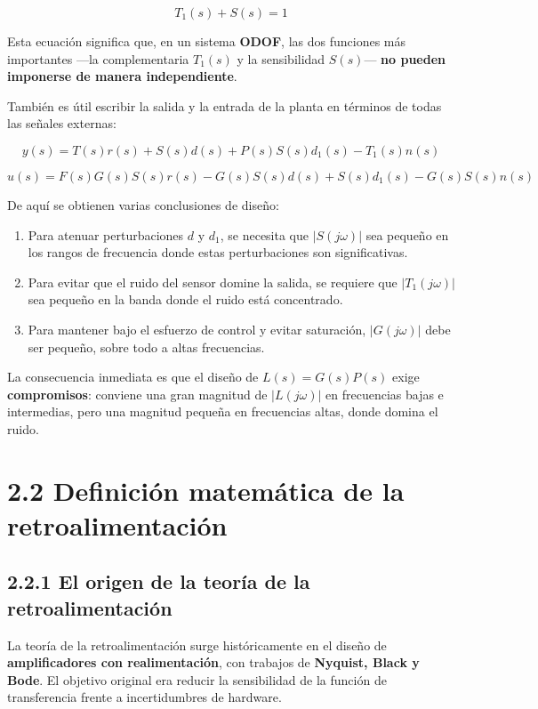 \[
T_1(s)+S(s)=1 \tag{2.1.8}
\]

Esta ecuación significa que, en un sistema \textbf{ODOF}, las dos funciones más importantes —la complementaria \(T_1(s)\) y la sensibilidad \(S(s)\)— \textbf{no pueden imponerse de manera independiente}.

También es útil escribir la salida y la entrada de la planta en términos de todas las señales externas:

\[
y(s)=T(s)r(s)+S(s)d(s)+P(s)S(s)d_1(s)-T_1(s)n(s) \tag{2.1.9}
\]

$$
u(s)=F(s)G(s)S(s)r(s)-G(s)S(s)d(s)+S(s)d_1(s)-G(s)S(s)n(s)
$$

De aquí se obtienen varias conclusiones de diseño:

\begin{enumerate}
  \item Para atenuar perturbaciones \(d\) y \(d_1\), se necesita que \(|S(j\omega)|\) sea pequeño en los rangos de frecuencia donde estas perturbaciones son significativas.
  \item Para evitar que el ruido del sensor domine la salida, se requiere que \(|T_1(j\omega)|\) sea pequeño en la banda donde el ruido está concentrado.
  \item Para mantener bajo el esfuerzo de control y evitar saturación, \(|G(j\omega)|\) debe ser pequeño, sobre todo a altas frecuencias.
\end{enumerate}

La consecuencia inmediata es que el diseño de \(L(s)=G(s)P(s)\) exige \textbf{compromisos}: conviene una gran magnitud de \(|L(j\omega)|\) en frecuencias bajas e intermedias, pero una magnitud pequeña en frecuencias altas, donde domina el ruido.



\section{2.2 Definición matemática de la retroalimentación}

\subsection{2.2.1 El origen de la teoría de la retroalimentación}
La teoría de la retroalimentación surge históricamente en el diseño de \textbf{amplificadores con realimentación}, con trabajos de \textbf{Nyquist, Black y Bode}. El objetivo original era reducir la sensibilidad de la función de transferencia frente a incertidumbres de hardware.

